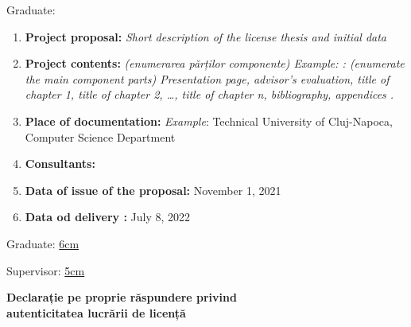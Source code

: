 \vspace{2cm}

\begin{center}
	Graduate: {\bf \thesisauthor}
	
	\vspace{1cm}
	
	{\bf \thesistitle}
\end{center}

\vspace{5mm}

\begin{enumerate}
	\item {\bf Project proposal:} {\it Short description of the license thesis  and initial data}
	\item {\bf Project contents:} {\it (enumerarea părților componente) Example: : (enumerate the main component parts) Presentation page, advisor's evaluation, title of chapter 1, title of chapter 2, …, title of chapter n, bibliography, appendices .}
	\item {\bf Place of documentation:} {\it Example}: Technical University of Cluj-Napoca, Computer Science Department 
	\item {\bf Consultants:}
	\item {\bf Data of issue of the proposal:} November 1, 2021 %
	\item {\bf Data od delivery :} July 8, 2022 %
\end{enumerate}
\vspace{1.2cm}

\hspace{6cm} Graduate: \uline{6cm} 

\vspace{0.5cm}
\hspace{6cm} Supervisor: \uline{5cm} 
\newpage
\begin{center}
	{\department}
\end{center}
\vspace{1cm}
\begin{center}
	{\bf Declarație pe proprie răspundere privind\\ 
		autenticitatea lucrării de licență}
\end{center}
\vspace{1cm}

